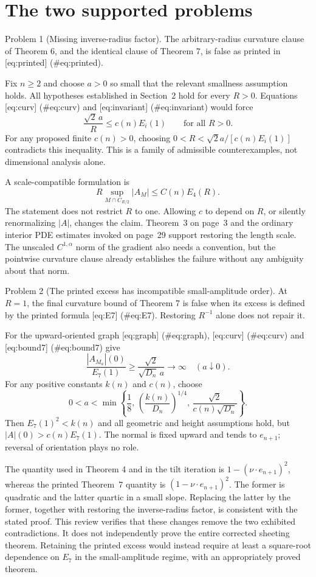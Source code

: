 \documentclass[10pt]{article}
\begin{document}
\section*{The two supported problems}
Problem 1 (Missing inverse-radius factor).  The arbitrary-radius curvature clause of Theorem 6, and the identical clause of Theorem 7, is false as printed in [eq:printed] (\#eq:printed).\par
Fix \(n\ge2\) and choose \(a>0\) so small that the relevant smallness assumption holds. All hypotheses established in Section 2 hold for every \(R>0\). Equations [eq:curv] (\#eq:curv) and [eq:invariant] (\#eq:invariant) would force \[\frac{\sqrt2\,a}{R}\le c(n)E_i(1)\qquad\text{for all }R>0.\] For any proposed finite \(c(n)>0\), choosing \(0<R<\sqrt2a/[c(n)E_i(1)]\) contradicts this inequality. This is a family of admissible counterexamples, not dimensional analysis alone.\par
A scale-compatible formulation is \[R\sup_{M\cap C_{R/2}}|A_M|\le C(n)E_4(R).\] The statement does not restrict \(R\) to one. Allowing \(c\) to depend on \(R\), or silently renormalizing \(|A|\), changes the claim. Theorem 3 on page 3 and the ordinary interior PDE estimates invoked on page 29 support restoring the length scale. The unscaled \(C^{1,\alpha}\) norm of the gradient also needs a convention, but the pointwise curvature clause already establishes the failure without any ambiguity about that norm.\par
Problem 2 (The printed excess has incompatible small-amplitude order).  At \(R=1\), the final curvature bound of Theorem 7 is false when its excess is defined by the printed formula [eq:E7] (\#eq:E7). Restoring \(R^{-1}\) alone does not repair it.\par
For the upward-oriented graph [eq:graph] (\#eq:graph), [eq:curv] (\#eq:curv) and [eq:bound7] (\#eq:bound7) give \[\frac{|A_{M_a}|(0)}{E_7(1)}
 \ge\frac{\sqrt2}{\sqrt{D_n}\,a}\longrightarrow\infty
 \quad(a\downarrow0).\] For any positive constants \(k(n)\) and \(c(n)\), choose \[0<a<\min\left\{\frac18,\,
 \left(\frac{k(n)}{D_n}\right)^{1/4},\,
 \frac{\sqrt2}{c(n)\sqrt{D_n}}\right\}.\] Then \(E_7(1)^2<k(n)\) and all geometric and height assumptions hold, but \(|A|(0)>c(n)E_7(1)\). The normal is fixed upward and tends to \(e_{n+1}\); reversal of orientation plays no role.\par
The quantity used in Theorem 4 and in the tilt iteration is \(1-(\nu\cdot e_{n+1})^2\), whereas the printed Theorem 7 quantity is \((1-\nu\cdot e_{n+1})^2\). The former is quadratic and the latter quartic in a small slope. Replacing the latter by the former, together with restoring the inverse-radius factor, is consistent with the stated proof. This review verifies that these changes remove the two exhibited contradictions. It does not independently prove the entire corrected sheeting theorem. Retaining the printed excess would instead require at least a square-root dependence on \(E_7\) in the small-amplitude regime, with an appropriately proved theorem.\par
\end{document}
